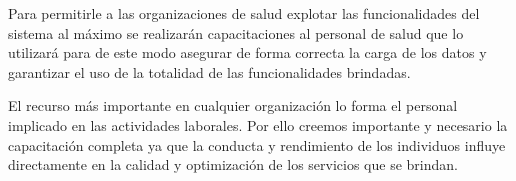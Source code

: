 \documentclass[a4paper,12pt]{article}
\begin{document}
Para permitirle a las organizaciones de salud explotar las funcionalidades del sistema al máximo se realizarán capacitaciones al personal de salud que lo utilizará para de este modo asegurar de forma correcta la carga de los datos y garantizar el uso de la totalidad de las funcionalidades brindadas.



El recurso más importante en cualquier organización lo forma el personal implicado
en las actividades laborales. Por ello creemos importante y necesario la capacitación completa ya que  la conducta y rendimiento de los individuos influye
directamente en la calidad y optimización de los servicios que se brindan.



\end{document}
